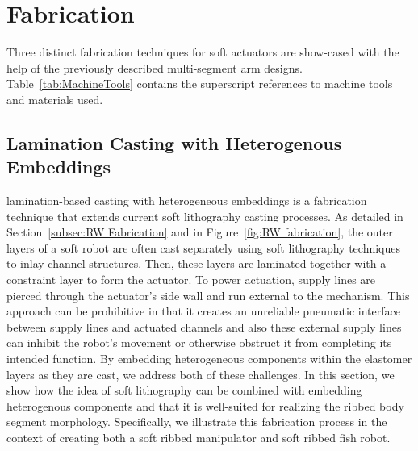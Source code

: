 \section{Fabrication}
\label{sec:Fabrication}
Three distinct fabrication techniques for soft actuators are show-cased with the help of the previously described multi-segment arm designs.
Table~\ref{tab:MachineTools} contains the superscript references to machine tools and materials used.

	
\subsection{Lamination Casting with Heterogenous Embeddings}
\label{subsec:Fabrication, Lamination Casting with Heterogenous Embeddings}
lamination-based casting with heterogeneous embeddings is a fabrication technique that extends current soft lithography casting processes.
%
As detailed in Section~\ref{subsec:RW Fabrication} and in Figure~\ref{fig:RW fabrication}, the outer layers of a soft robot are often cast separately using soft lithography techniques to inlay channel structures. Then, these layers are laminated together with a constraint layer to form the actuator.
%
To power actuation, supply lines are pierced through the actuator's side wall and run external to the mechanism.
%
This approach can be prohibitive in that it creates an unreliable pneumatic interface between supply lines and actuated channels and also these external supply lines can inhibit the robot's movement or otherwise obstruct it from completing its intended function.
% 
By embedding heterogeneous components within the elastomer layers as they are cast, we address both of these challenges.
%
In this section, we show how the idea of soft lithography can be combined with embedding heterogenous components and that it is well-suited for realizing the ribbed body segment morphology.
%
Specifically, we illustrate this fabrication process in the context of creating both a soft ribbed manipulator and soft ribbed fish robot.

